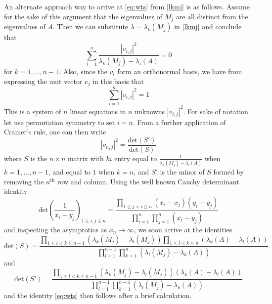 \documentclass{amsart}
\begin{document}
An alternate approach way to arrive at \eqref{eq:wts} from \eqref{lkmj} is as follows.  Assume for the sake of this argument that the eigenvalues of $M_j$ are all distinct from the eigenvalues of $A$.  Then we can substitute $\lambda = \lambda_k(M_j)$ in \eqref{lkmj} and conclude that
\begin{equation}\label{la}
\sum_{i=1}^n \frac{|v_{i,j}|^2}{\lambda_k(M_j) - \lambda_i(A)} = 0
\end{equation}
for $k=1,\dots,n-1$.  Also, since the $v_i$ form an orthonormal basis, we have from expressing the unit vector $e_j$ in this basis that
\begin{equation}\label{vij}
 \sum_{i=1}^n |v_{i,j}|^2 = 1
\end{equation}
This is a system of $n$ linear equations in $n$ unknowns $|v_{i,j}|^2$.  For sake of notation let use permutation symmetry to set $i=n$.  From a further application of Cramer's rule, one can then write
$$ |v_{n,j}|^2 = \frac{\mathrm{det}(S')}{\mathrm{det}(S)}$$
where $S$ is the $n \times n$ matrix with $ki$ entry equal to $\frac{1}{\lambda_k(M_j) - \lambda_i(A)}$ when $k=1,\dots,n-1$, and equal to $1$ when $k=n$, and $S'$ is the minor of $S$ formed by removing the $n^{\mathrm{th}}$ row and column.  Using the well known Cauchy determinant identity \cite{cauchy}
\begin{equation}\label{cauchy-det}
\mathrm{det} \left( \frac{1}{x_i-y_j} \right)_{1 \leq i,j \leq n} = \frac{\prod_{1 \leq j < i \leq n} (x_i-x_j)(y_i-y_j)}{\prod_{i=1}^n \prod_{j=1}^n (x_i-y_j)}
\end{equation}
and inspecting the asymptotics as $x_n \to \infty$, we soon arrive at the identities
$$ \mathrm{det}(S) = \frac{ \prod_{1 \leq l < k \leq n-1} (\lambda_k(M_j) - \lambda_l(M_j)) \prod_{1 \leq l < k \leq n} (\lambda_k(A) - \lambda_l(A))}{\prod_{l=1}^{n-1} \prod_{k=1}^n (\lambda_l(M_j) - \lambda_k(A))}$$
and
$$ \mathrm{det}(S') = \frac{ \prod_{1 \leq l < k \leq n-1} (\lambda_k(M_j) - \lambda_l(M_j)) (\lambda_k(A) - \lambda_l(A))}{\prod_{l=1}^{n-1} \prod_{k=1}^{n-1} (\lambda_l(M_j) - \lambda_k(A))}$$
and the identity \eqref{eq:wts} then follows after a brief calculation.
\end{document}
